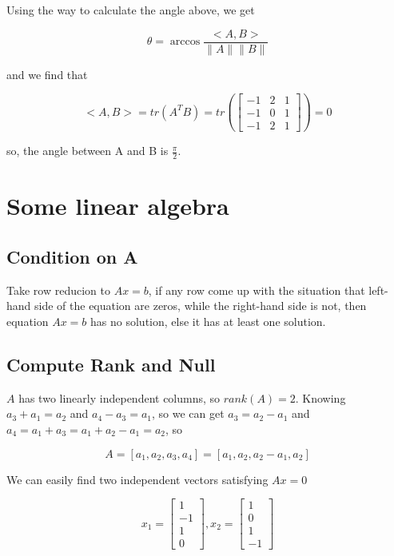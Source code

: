 \documentclass{article}
\begin{document}
Using the way to calculate the angle above, we get 

\begin{equation}
    \theta = \arccos{\frac{<A,B>}{\|A\|\|B\|}}
\end{equation}

and we find that

\begin{equation}
    <A,B>=tr(A^TB)=tr(
    \begin{bmatrix}
        -1 & 2 & 1 \\
        -1 & 0 & 1 \\
        -1 & 2 & 1
    \end{bmatrix})
    =0
\end{equation}

so, the angle between A and B is $\frac{\pi}{2}$.

\section{Some linear algebra}

\subsection{Condition on A}

Take row reducion to $Ax=b$, if any row come up with the situation 
that left-hand side of the equation are zeros, while the right-hand side is not, 
then equation $Ax=b$ has no solution, else it has at least one solution.

\subsection{Compute Rank and Null}

$A$ has two linearly independent columns, so $rank(A)=2$. Knowing $a_3+a_1=a_2$ and $a_4-a_3=a_1$, so we can get $a_3=a_2-a_1$ 
and $a_4=a_1+a_3=a_1+a_2-a_1=a_2$, so

\begin{equation}
    A=[a_1,a_2,a_3,a_4]=[a_1,a_2,a_2-a_1,a_2]
\end{equation}

We can easily find two independent vectors satisfying $Ax=0$

\begin{equation}
    x_1=
    \begin{bmatrix}
        1\\-1\\1\\0
    \end{bmatrix},
    x_2=
    \begin{bmatrix}
        1\\0\\1\\-1
    \end{bmatrix}
\end{equation}
\end{document}
